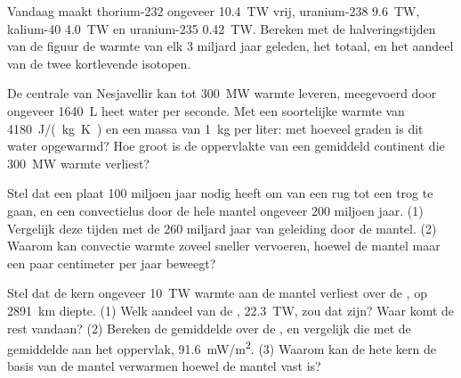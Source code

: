 \begin{exercise}[$\star\star\star$]\label{exo:g12:internal-heat:12}
Vandaag maakt thorium-232 ongeveer \qty{10.4}{TW} vrij, uranium-238 \qty{9.6}{TW},
kalium-40 \qty{4.0}{TW} en uranium-235 \qty{0.42}{TW}. Bereken met de
halveringstijden van de figuur de warmte van
elk 3 miljard jaar geleden, het totaal, en het aandeel van de twee kortlevende
isotopen.
\end{exercise}

\begin{exercise}[$\star\star\star$]\label{exo:g12:internal-heat:13}
De centrale van Nesjavellir kan tot \qty{300}{MW} warmte leveren,
meegevoerd door ongeveer \qty{1640}{L} heet water per seconde. Met een soortelijke warmte
van \qty{4180}{J/(kg.K)} en een massa van \qty{1}{kg} per liter: met hoeveel
graden is dit water opgewarmd? Hoe groot is de oppervlakte van een gemiddeld continent
die \qty{300}{MW} warmte verliest?
\end{exercise}

\begin{exercise}[$\star\star\star$]\label{exo:g12:internal-heat:14}
Stel dat een plaat 100 miljoen jaar nodig heeft om van een rug tot een trog te gaan, en een
convectielus door de hele mantel ongeveer 200 miljoen jaar. (1)
Vergelijk deze tijden met de 260 miljard jaar van geleiding door de
mantel. (2) Waarom kan convectie warmte zoveel sneller vervoeren, hoewel de
mantel maar een paar centimeter per jaar beweegt?
\end{exercise}

\begin{exercise}[$\star\star\star$]\label{exo:g12:internal-heat:15}
Stel dat de kern ongeveer \qty{10}{TW} warmte aan de mantel verliest over
de , op \qty{2891}{km} diepte. (1) Welk aandeel van de
, \qty{22.3}{TW}, zou dat zijn? Waar komt de rest
vandaan? (2) Bereken de gemiddelde  over de
, en vergelijk die met de gemiddelde  aan het oppervlak,
\qty{91.6}{mW/m^2}. (3) Waarom kan de hete kern de basis van de mantel verwarmen
hoewel de mantel vast is?
\end{exercise}

